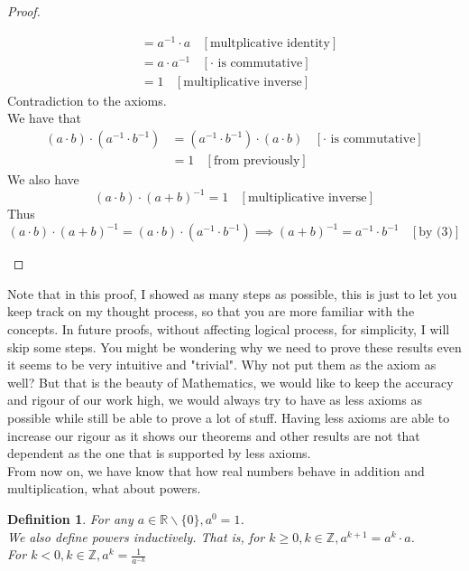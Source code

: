 \documentclass{book}
\newtheorem{definition}[theorem]{Definition}
\begin{document}
\begin{proof}
\begin{itemize}[itemsep = 0pt]
\begin{align*}
            & = a^{-1} \cdot a \ \ \ \ [\text{multplicative identity}] \\
            & = a \cdot a^{-1} \ \ \ \ [\cdot \text{ is commutative}] \\
            & = 1 \ \ \ \ [\text{multiplicative inverse}]
        \end{align*}
        Contradiction to the axioms. \\
        We have that
        \begin{align*}
            (a \cdot b) \cdot (a^{-1} \cdot b^{-1}) & = (a^{-1} \cdot b^{-1}) \cdot (a \cdot b) \ \ \ \ [\cdot \text{ is commutative}] \\
           & = 1 \ \ \ \ [\text{from previously}]
        \end{align*}
        We also have
        $$(a \cdot b) \cdot (a + b)^{-1} = 1 \ \ \ \ [\text{multiplicative inverse}]$$
        Thus
        $$(a \cdot b) \cdot (a + b)^{-1} = (a \cdot b) \cdot (a^{-1} \cdot b^{-1}) \implies (a + b)^{-1} = a^{-1} \cdot b^{-1} \ \ \ \ [\text{by (3)}]$$
    \end{itemize}
\end{proof}

Note that in this proof, I showed as many steps as possible, this is just to let you keep track on my thought process, so that you are more familiar with the concepts. In future proofs, without affecting logical process, for simplicity, I will skip some steps.
You might be wondering why we need to prove these results even it seems to be very intuitive and "trivial". Why not put them as the axiom as well? But that is the beauty of Mathematics, we would like to keep the accuracy and rigour of our work high, we would always try to have as less axioms as possible while still be able to prove a lot of stuff. Having less axioms are able to increase our rigour as it shows our theorems and other results are not that dependent as the one that is supported by less axioms. \\
From now on, we have know that how real numbers behave in addition and multiplication, what about powers.

\begin{definition}
    For any $a \in \mathbb{R} \backslash \{ 0 \}, a^{0} = 1$. \\
    We also define powers inductively. That is, for $k \geq 0, k \in \mathbb{Z}, a^{k + 1} = a^{k} \cdot a$. \\
    For $k < 0, k \in \mathbb{Z}, a^{k} = \frac{1}{a^{-k}}$
\end{definition}
\end{document}

